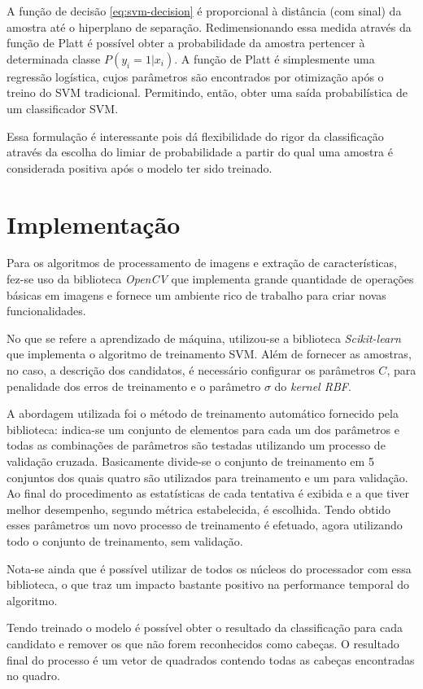 A função de decisão \eqref{eq:svm-decision} é proporcional à distância (com sinal) da amostra até o hiperplano de separação. Redimensionando essa medida através da função de Platt \cite{svmProbabilisticOutput} é possível obter a probabilidade da amostra pertencer à determinada classe $P(y_i=1 | x_i)$. A função de Platt é simplesmente uma regressão logística, cujos parâmetros são encontrados por otimização após o treino do SVM tradicional. Permitindo, então, obter uma saída probabilística de um classificador SVM.

Essa formulação é interessante pois dá flexibilidade do rigor da classificação através da escolha do limiar de probabilidade a partir do qual uma amostra é considerada positiva após o modelo ter sido treinado.

\section{Implementação}
Para os algoritmos de processamento de imagens e extração de características, fez-se uso da biblioteca \textit{OpenCV} que implementa grande quantidade de operações básicas em imagens e fornece um ambiente rico de trabalho para criar novas funcionalidades.

No que se refere a aprendizado de máquina, utilizou-se a biblioteca \textit{Scikit-learn} \cite{scikit-learn} que implementa o algoritmo de treinamento SVM. Além de fornecer as amostras, no caso, a descrição dos candidatos, é necessário configurar os parâmetros $C$, para penalidade dos erros de treinamento e o parâmetro $\sigma$ do \textit{kernel RBF}. 

A abordagem utilizada foi o método de treinamento automático fornecido pela biblioteca: indica-se um conjunto de elementos para cada um dos parâmetros e todas as combinações de parâmetros são testadas utilizando um processo de validação cruzada. Basicamente divide-se o conjunto de treinamento em 5 conjuntos dos quais quatro são utilizados para treinamento e um para validação. Ao final do procedimento as estatísticas de cada tentativa é exibida e a que tiver melhor desempenho, segundo métrica estabelecida, é escolhida. Tendo obtido esses parâmetros um novo processo de treinamento é efetuado, agora utilizando todo o conjunto de treinamento, sem validação.

Nota-se ainda que é possível utilizar de todos os núcleos do processador com essa biblioteca, o que traz um impacto bastante positivo na performance temporal do algoritmo.

Tendo treinado o modelo é possível obter o resultado da classificação para cada candidato e remover os que não forem reconhecidos como cabeças. O resultado final do processo é um vetor de quadrados contendo todas as cabeças encontradas no quadro.

